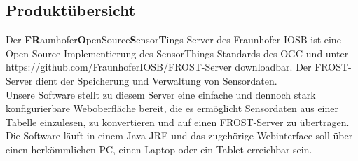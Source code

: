 \documentclass[12 pt]{article}
\begin{document}
\subsection{Produktübersicht}

Der \textbf{FR}aunhofer\textbf{O}penSource\textbf{S}ensor\textbf{T}ings-Server des Fraunhofer IOSB ist eine Open-Source-Implementierung des SensorThings-Standards des OGC und unter https://github.com/FraunhoferIOSB/FROST-Server downloadbar. Der FROST-Server dient der Speicherung und Verwaltung von Sensordaten.\\
Unsere Software stellt zu diesem Server eine einfache und dennoch stark konfigurierbare Weboberfläche bereit, die es ermöglicht Sensordaten aus einer Tabelle einzulesen, zu konvertieren und auf einen FROST-Server zu übertragen. Die Software läuft in einem Java JRE und das zugehörige Webinterface soll über einen herkömmlichen PC, einen Laptop oder ein Tablet erreichbar sein.\\
\end{document}

